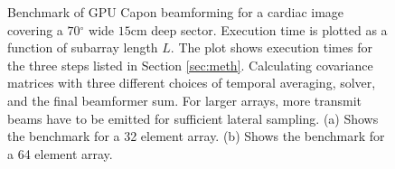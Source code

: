 \documentclass[12pt,journal,onecolumn]{IEEEtran}
\newcommand{\degree}{\ensuremath{^\circ}}
\begin{document}
\begin{figure}[!t]
\centerline{
\hfil
{}}
\caption{Benchmark of GPU Capon beamforming for a cardiac image covering a $70\degree$ wide $15$cm deep sector. Execution time is plotted as a function of subarray length $L$. The plot shows execution times for the three steps listed in Section \ref{sec:meth}. Calculating covariance matrices with three different choices of temporal averaging, solver, and the final beamformer sum. For larger arrays, more transmit beams have to be emitted for sufficient lateral sampling. (a) Shows the benchmark for a 32 element array. (b) Shows the benchmark for a 64 element array.}
\label{fig:bench}
\end{figure}
\end{document}
